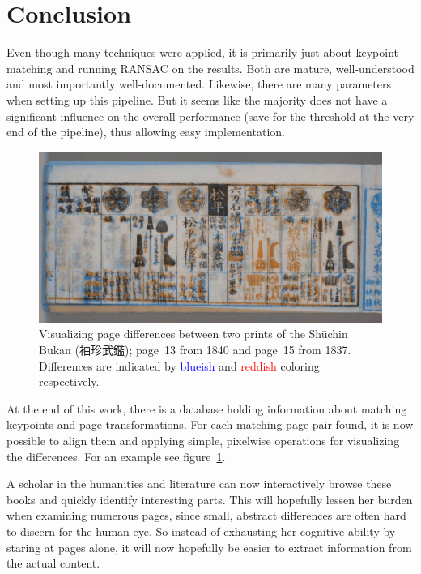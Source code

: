 \documentclass{ltjarticle}
\begin{document}
\section{Conclusion}

Even though many techniques were applied, it is primarily just about keypoint matching and running RANSAC on the results. Both are mature, well-understood and most importantly well-documented. Likewise, there are many parameters when setting up this pipeline. But it seems like the majority does not have a significant influence on the overall performance (save for the threshold at the very end of the pipeline), thus allowing easy implementation.

\begin{figure}
    \centering
    \includegraphics[width=\textwidth]{page-compare.jpg}
    \caption[Visualizing page differences]{Visualizing page differences between two prints of the Shūchin Bukan (袖珍武鑑); page~13 from 1840 and page~15 from 1837. Differences are indicated by \textcolor{blue}{blueish} and \textcolor{red}{reddish} coloring respectively.}
    \label{fig:page-compare}
\end{figure}

At the end of this work, there is a database holding information about matching keypoints and page transformations. For each matching page pair found, it is now possible to align them and applying simple, pixelwise operations for visualizing the differences. For an example see figure~\ref{fig:page-compare}.

A scholar in the humanities and literature can now interactively browse these books and quickly identify interesting parts. This will hopefully lessen her burden when examining numerous pages, since small, abstract differences are often hard to discern for the human eye. So instead of exhausting her cognitive ability by staring at pages alone, it will now hopefully be easier to extract information from the actual content.
\end{document}
